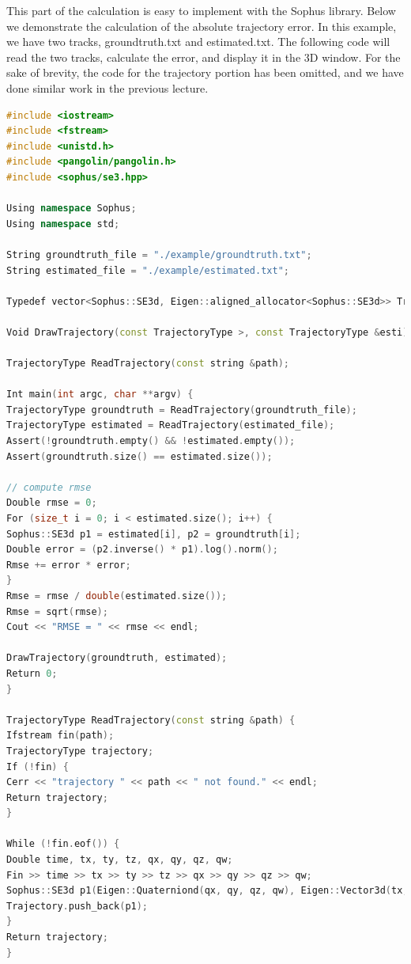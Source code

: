 This part of the calculation is easy to implement with the Sophus library. Below we demonstrate the calculation of the absolute trajectory error. In this example, we have two tracks, groundtruth.txt and estimated.txt. The following code will read the two tracks, calculate the error, and display it in the 3D window. For the sake of brevity, the code for the trajectory portion has been omitted, and we have done similar work in the previous lecture.
\begin{lstlisting}[language=c++,caption=slambook/ch4/example/trajectoryError.cpp(part)]
#include <iostream>
#include <fstream>
#include <unistd.h>
#include <pangolin/pangolin.h>
#include <sophus/se3.hpp>

Using namespace Sophus;
Using namespace std;

String groundtruth_file = "./example/groundtruth.txt";
String estimated_file = "./example/estimated.txt";

Typedef vector<Sophus::SE3d, Eigen::aligned_allocator<Sophus::SE3d>> TrajectoryType;

Void DrawTrajectory(const TrajectoryType >, const TrajectoryType &esti);

TrajectoryType ReadTrajectory(const string &path);

Int main(int argc, char **argv) {
TrajectoryType groundtruth = ReadTrajectory(groundtruth_file);
TrajectoryType estimated = ReadTrajectory(estimated_file);
Assert(!groundtruth.empty() && !estimated.empty());
Assert(groundtruth.size() == estimated.size());

// compute rmse
Double rmse = 0;
For (size_t i = 0; i < estimated.size(); i++) {
Sophus::SE3d p1 = estimated[i], p2 = groundtruth[i];
Double error = (p2.inverse() * p1).log().norm();
Rmse += error * error;
}
Rmse = rmse / double(estimated.size());
Rmse = sqrt(rmse);
Cout << "RMSE = " << rmse << endl;

DrawTrajectory(groundtruth, estimated);
Return 0;
}

TrajectoryType ReadTrajectory(const string &path) {
Ifstream fin(path);
TrajectoryType trajectory;
If (!fin) {
Cerr << "trajectory " << path << " not found." << endl;
Return trajectory;
}

While (!fin.eof()) {
Double time, tx, ty, tz, qx, qy, qz, qw;
Fin >> time >> tx >> ty >> tz >> qx >> qy >> qz >> qw;
Sophus::SE3d p1(Eigen::Quaterniond(qx, qy, qz, qw), Eigen::Vector3d(tx, ty, tz));
Trajectory.push_back(p1);
}
Return trajectory;
}
\end{lstlisting}


